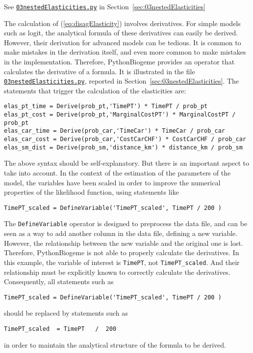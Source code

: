 \documentclass[12pt,a4paper]{article}
\newcommand{\req}[1]{(\ref{#1})}
\begin{document}
\begin{flushright}
See \href{http://biogeme.epfl.ch/examples/indicators/python/03nestedElasticities.py}{\lstinline$03nestedElasticities.py$} in Section~\ref{sec:03nestedElasticities}
\end{flushright}

The calculation of \req{eq:disagElasticity} involves derivatives. For
simple models such as logit, the analytical formula of these
derivatives can easily be derived. However, their derivation for
advanced models can be tedious. It is common to make mistakes in the
derivation itself, and even more common to make mistakes in the
implementation. Therefore, PythonBiogeme provides an operator that
calculates the derivative of a formula. It is illustrated in the
file \href{http://biogeme.epfl.ch/examples/indicators/python/03nestedElasticities.py}{\lstinline$03nestedElasticities.py$}, reported in
Section~\ref{sec:03nestedElasticities}. The statements that trigger
the calculation of the elasticities are:
\begin{lstlisting}
elas_pt_time = Derive(prob_pt,'TimePT') * TimePT / prob_pt
elas_pt_cost = Derive(prob_pt,'MarginalCostPT') * MarginalCostPT / prob_pt
elas_car_time = Derive(prob_car,'TimeCar') * TimeCar / prob_car
elas_car_cost = Derive(prob_car,'CostCarCHF') * CostCarCHF / prob_car
elas_sm_dist = Derive(prob_sm,'distance_km') * distance_km / prob_sm
\end{lstlisting}
The above syntax should be self-explanatory. But there is an important
aspect to take into account. In the context of the estimation of the
parameters of the model, the variables have been scaled in order to
improve the numerical properties of the likelihood function, using
statements like
\begin{lstlisting}
TimePT_scaled = DefineVariable('TimePT_scaled', TimePT / 200 )
\end{lstlisting}
The \lstinline$DefineVariable$ operator is designed to preprocess the
data file, and can be seen as a way to add another column in the data
file, defining a new variable. However, the relationship between  the
new variable and the original one is lost. Therefore,
PythonBiogeme is not able to properly calculate the
derivatives. In this example, the variable of interest is
\lstinline$TimePT$, not \lstinline$TimePT_scaled$. And their
relationship must be explicitly known to correctly calculate the derivatives.   Consequently, all statements such as 
\begin{lstlisting}
TimePT_scaled = DefineVariable('TimePT_scaled', TimePT / 200 )
\end{lstlisting}
should be replaced by statements such as
\begin{lstlisting}
TimePT_scaled  = TimePT   /  200 
\end{lstlisting}
in order to maintain the analytical structure of the formula to be derived.
\end{document}
